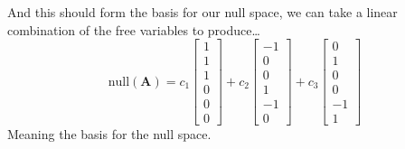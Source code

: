 \documentclass{article}
\begin{document}
            And this should form the basis for our null space, we can take
            a linear combination of the free variables to produce\dots
            \[
                \text{null}(\mathbf{A})=
                c_1\begin{bmatrix}1\\1\\1\\0\\0\\0\end{bmatrix}+
                c_2\begin{bmatrix}-1\\0\\0\\1\\-1\\0\end{bmatrix}+
                c_3\begin{bmatrix}0\\1\\0\\0\\-1\\1\end{bmatrix}
            \]
            Meaning the basis for the null space.
\end{document}
